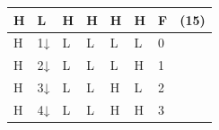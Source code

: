 \documentclass[a4paper, 11pt, uplatex]{jsarticle}
\begin{document}
\begin{table}[H]
\begin{center}
\begin{tabular}{|l|l|l|l|l|l|l|l|}
H                                                                 & L                                                                 & H                                                               & H                                                               & H                                                               & H                                                               & F                                                                       & (15)                \\ \hline
H                                                                 & 1↓                                                                & L                                                               & L                                                               & L                                                               & L                                                               & 0                                                                       &                     \\ \hline
H                                                                 & 2↓                                                                & L                                                               & L                                                               & L                                                               & H                                                               & 1                                                                       &                     \\ \hline
H                                                                 & 3↓                                                                & L                                                               & L                                                               & H                                                               & L                                                               & 2                                                                       &                     \\ \hline
H                                                                 & 4↓                                                                & L                                                               & L                                                               & H                                                               & H                                                               & 3                                                                       &                     \\ \hline

\end{tabular}
\end{center}
\end{table}
\end{document}
